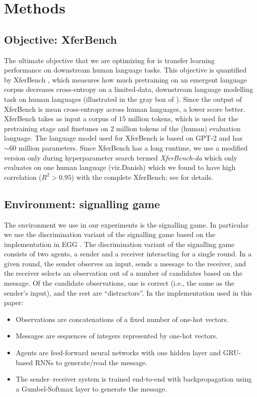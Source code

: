 \section{Methods}
\unskip\label{hpo:sec:methods}
\subsection{Objective: XferBench}

The ultimate objective that we are optimizing for is transfer learning performance on downstream human language tasks.
This objective is quantified by XferBench \citep[MIT license]{xferbench}, which measures how much pretraining on an emergent language corpus decreases cross-entropy on a limited-data, downstream language modelling task on human languages (illustrated in the gray box of ).
Since the output of XferBench is mean cross-entropy across human languages, a lower score better.
XferBench takes as input a corpus of $15$ million tokens, which is used for the pretraining stage and finetunes on $2$ million tokens of the (human) evaluation language.
The language model used for XferBench is based on GPT-2 \citep{radford2019language} and has ${\sim}60$ million parameters.
Since XferBench has a long runtime, we use a modified version only during hyperparameter search termed \emph{XferBench-da} which only evaluates on one human language (viz.\@ Danish) which we found to have high correlation ($R^2>0.95$) with the complete XferBench; see  for details.

\subsection{Environment: signalling game}
The environment we use in our experiments is the signalling game.
In particular we use the discrimination variant of the signalling game based on the implementation in EGG \citep[\url{https://github.com/facebookresearch/EGG}, MIT license]{kharitonov-etal-2019-egg}.
The discrimination variant of the signalling game consists of two agents, a sender and a receiver interacting for a single round.
In a given round, the sender observes an input, sends a message  to the receiver, and the receiver selects an observation out of a number of candidates based on the message.
Of the candidate observations, one is correct (i.e., the same as the sender's input), and the rest are ``distractors''.
In the implementation used in this paper:
\begin{itemize}[nosep]
  \item Observations are concatenations of a fixed number of one-hot vectors.
  \item Messages are sequences of integers represented by one-hot vectors.
  \item Agents are feed-forward neural networks with one hidden layer and GRU-based RNNs to generate/read the message.
  \item The sender--receiver system is trained end-to-end with backpropagation using a Gumbel-Softmax layer \citep{maddison2017the,jang2017categorical} to generate the message.
\end{itemize}


